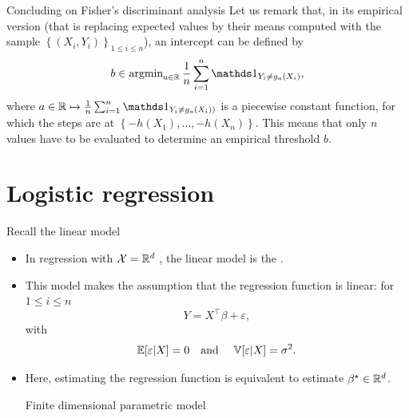 \documentclass[xcolor={usenames,dvipsnames},handout]{beamer}
\begin{document}
\begin{frame}{Concluding on Fisher's discriminant analysis }
	Let us remark that, in its empirical version (that is replacing expected values by their means computed with the sample $\left\{(X_i, Y_i)\right\}_{1 \le i \le n}$), an intercept can be defined by
	$$
		b \in \argmin_{a \in \R} \frac 1n \sum_{i=1}^n \one_{Y_i \neq g_a(X_i)},
	$$
	where $a \in \R \mapsto \frac 1n \sum_{i=1}^n \one_{Y_i \neq g_a(X_i))}$ is a piecewise constant function, for which the steps are at $\left\{ -h(X_1), \dots, -h(X_n) \right\}$.
	This means that only $n$ values have to be evaluated to determine an empirical threshold $b$.

\end{frame}



\section{Logistic regression}




\begin{frame}{Recall the linear model}
\begin{itemize}
\item In regression with ${\mathcal{X}} = \mathbb{R}^d$ , the linear model is the .
\pause 
\item This model makes the assumption that the regression function is linear: for $1\leq i \leq n$
$$
Y =  X^\top \beta +\varepsilon,
$$
with 
$$
\mathbb{E} [ \varepsilon| X ] = 0 \quad \text{and } \quad \mathbb{V} [ \varepsilon | X] = \sigma^2.
$$
\item Here, estimating the regression function is equivalent to estimate $\beta^\star \in \mathbb{R}^d$.

\vspace{.2cm}

{\color{Vert}Finite dimensional parametric model}
\end{itemize} 
\end{frame}
\end{document}
